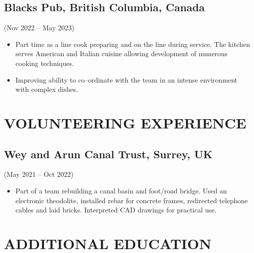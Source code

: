 \documentclass[../main.tex]{subfiles}
\begin{document}
    \subsection*{Blacks Pub, British Columbia, Canada}(Nov 2022 – May 2023)
    \begin{itemize}
        \item Part time as a line cook preparing and on the line during service. The kitchen serves American and Italian cuisine allowing development of numerous cooking techniques.
        \item Improving ability to co--ordinate with the team in an intense environment with complex dishes.
    \end{itemize}
    

\section*{VOLUNTEERING EXPERIENCE}
   
    \subsection*{Wey and Arun Canal Trust, Surrey, UK}(May 2021 – Oct 2022)
        \begin{itemize}
            \item Part of a team rebuilding a canal basin and foot/road bridge. Used an electronic theodolite, installed rebar for concrete frames, redirected telephone cables and laid bricks. Interpreted CAD drawings for practical use.
        \end{itemize}

\section*{ADDITIONAL EDUCATION}
\end{document}
